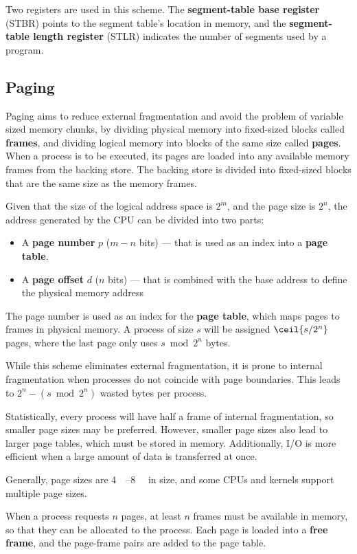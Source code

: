 \documentclass{article}
\begin{document}
Two registers are used in this scheme. The \textbf{segment-table base
register} (STBR) points to the segment table's location in memory, and
the \textbf{segment-table length register} (STLR) indicates the number
of segments used by a program.
\subsection{Paging}
Paging aims to reduce external fragmentation and avoid the problem of
variable sized memory chunks, by dividing physical memory into
fixed-sized blocks called \textbf{frames}, and dividing logical memory
into blocks of the same size called \textbf{pages}. When a process is
to be executed, its pages are loaded into any available memory frames
from the backing store. The backing store is divided into fixed-sized
blocks that are the same size as the memory frames.

Given that the size of the logical address space is \(2^m\), and the
page size is \(2^n\), the address generated by the CPU can be divided
into two parts:
\begin{itemize}
    \item A \textbf{page number} \(p\) (\(m-n\) bits) --- that is used
          as an index into a \textbf{page table}.
    \item A \textbf{page offset} \(d\) (\(n\) bits) --- that is
          combined with the base address to define the physical memory
          address
\end{itemize}
The page number is used as an index for the \textbf{page table}, which
maps pages to frames in physical memory. A process of size \(s\) will
be assigned \(\ceil{s/2^n}\) pages, where the last page only uses
\(s \bmod 2^n\) bytes.

While this scheme eliminates external fragmentation, it is prone to
internal fragmentation when processes do not coincide with page
boundaries. This leads to \(2^n - \left( s \bmod 2^n \right)\) wasted
bytes per process.

Statistically, every process will have half a frame of internal
fragmentation, so smaller page sizes may be preferred. However,
smaller page sizes also lead to larger page tables, which must be
stored in memory. Additionally, I/O is more efficient when a large
amount of data is transferred at once.

Generally, page sizes are \qtyrange{4}{8}{\kilo\byte} in size, and some
CPUs and kernels support multiple page sizes.

When a process requests \(n\) pages, at least \(n\) frames must be
available in memory, so that they can be allocated to the process. Each
page is loaded into a \textbf{free frame}, and the page-frame pairs are
added to the page table.
\end{document}
